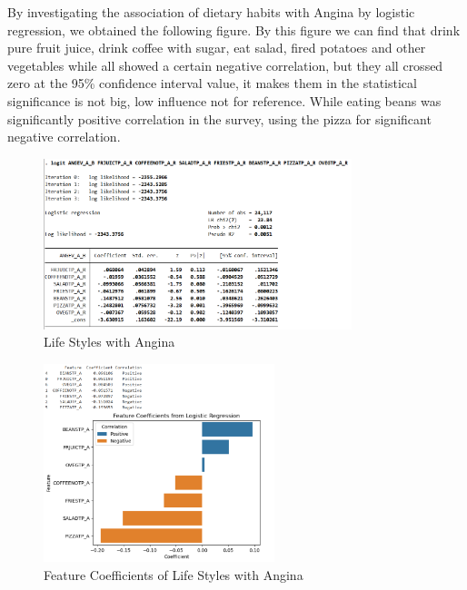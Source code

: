 \documentclass{article}
\begin{document}

By investigating the association of dietary habits with Angina by logistic regression, we obtained the following figure. By this figure we can find that drink pure fruit juice, drink coffee with sugar, eat salad, fired potatoes and other vegetables while all showed a certain negative correlation, but they all crossed zero at the 95\% confidence interval value, it makes them in the statistical significance is not big, low influence not for reference. While eating beans was significantly positive correlation in the survey, using the pizza for significant negative correlation.

\begin{figure}[!h]
	\centering
	\includegraphics[width=0.8\textwidth]{../Image/L_A.jpg}
	\caption{Life Styles with Angina}
	\label{fig:G6}
\end{figure}

\begin{figure}[!h]
	\centering
	\includegraphics[width=0.6\textwidth]{../Image/P7.jpg}
	\caption{Feature Coefficients of Life Styles with Angina}
	\label{fig:P7}
\end{figure}
\end{document}

